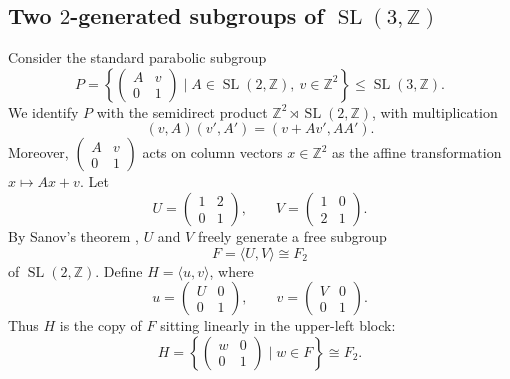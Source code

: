 \documentclass[]{amsart}
\newtheorem*{fixed point criterion}{\fixed point criterion}
\theoremstyle{definition}
\theoremstyle{remark}
\numberwithin{equation}{section}
\newcommand{\SL}{\operatorname{SL}}
\newcommand{\Z}{\mathbb Z}
\begin{document}
\subsection{Two $2$-generated subgroups of $\SL(3,\Z)$}
Consider the standard parabolic subgroup
\begin{equation}\label{eq. P}
  P=
\left\{
\begin{pmatrix}
A & v\\
0 & 1
\end{pmatrix}
\mid A\in \SL(2,\Z),\ v\in \Z^2
\right\}
\leq \SL(3,\Z).  
\end{equation}
We identify $P$ with the semidirect
product $\Z^2\rtimes \SL(2,\Z)$, with multiplication
\[
(v,A)(v',A')=(v+Av',AA').
\]
Moreover,
$\begin{pmatrix}
A & v\\
0 & 1
\end{pmatrix}
$
acts on column vectors $x\in \Z^2$ as the affine transformation
$x\longmapsto Ax+v.$ 
Let
\begin{equation}\label{eq. U V}
 U=\begin{pmatrix}1&2\\0&1\end{pmatrix},
\qquad
V=\begin{pmatrix}1&0\\2&1\end{pmatrix}.   
\end{equation}
By Sanov's theorem \cite{Sanov1947}, $U$ and $V$ freely generate a free subgroup
\begin{equation}\label{eq. F}
 F=\langle U,V\rangle\cong F_2   
\end{equation}
of $\SL(2,\Z)$. Define $H=\langle u,v\rangle$, where
\[
u=
\begin{pmatrix}
U&0\\
0&1
\end{pmatrix},
\qquad
v=
\begin{pmatrix}
V&0\\
0&1
\end{pmatrix}.
\]
Thus $H$ is the copy of $F$ sitting linearly in the upper-left block:
\[
H=
\left\{
\begin{pmatrix}
w & 0\\
0 & 1
\end{pmatrix}
\mid w\in F
\right\}
\cong F_2.
\]
\end{document}
